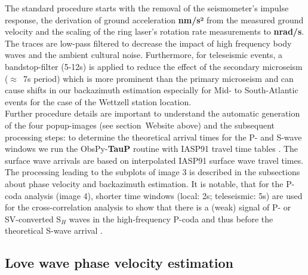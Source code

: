 \documentclass[12pt,reqno,letter]{article}
\begin{document}
The standard procedure starts with the removal of the seismometer’s impulse response, the derivation of ground acceleration \textbf{nm/s²} from the measured ground velocity and the scaling of the ring laser's rotation rate measurements to \textbf{nrad/s}. The traces are low-pass filtered to decrease the impact of high frequency body waves and the ambient cultural noise. Furthermore, for teleseismic events, a bandstop-filter (5-12s) is applied to reduce the effect of the secondary microseism ($\approx$~7s period) which is more prominent than the primary microseism \citep{Hadziioannou2012} and can cause shifts in our backazimuth estimation especially for Mid- to South-Atlantic events for the case of the Wettzell station location.\\
Further procedure details are important to understand the automatic generation of the four popup-images (see section~Website above) and the subsequent processing steps: 
to determine the theoretical arrival times for the P- and S-wave windows we run the ObsPy-\textbf{TauP} routine with IASP91 travel time tables \citep{Kennett1991}. The surface wave arrivals are  based on interpolated IASP91 surface wave travel times. The processing leading to the subplots of image 3 is described in the subsections about phase velocity and backazimuth estimation.
It is notable, that for the P-coda analysis (image 4), shorter time windows (local: 2s; teleseismic: 5s) are used for the cross-correlation analysis to show that there is a (weak) signal of P- or SV-converted S$_H$ waves in the high-frequency P-coda and thus before the theoretical S-wave arrival \citep{Pham2009}.

%
\subsection*{Love wave phase velocity estimation}
\label{subsec:pv}
\end{document}
